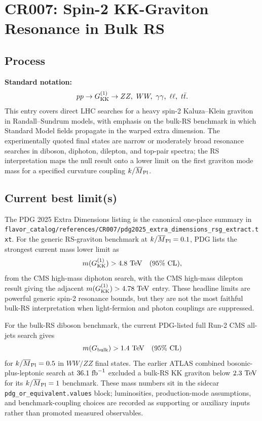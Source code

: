 
\section{CR007: Spin-2 KK-Graviton Resonance in Bulk RS}

\subsection*{Process}
\textbf{Standard notation:}
\[
  pp \to G^{(1)}_{\rm KK} \to ZZ,\ WW,\ \gamma\gamma,\ \ell\ell,\ t\bar t .
\]
This entry covers direct LHC searches for a heavy spin-2 Kaluza--Klein
graviton in Randall--Sundrum models, with emphasis on the bulk-RS benchmark in
which Standard Model fields propagate in the warped extra dimension.  The
experimentally quoted final states are narrow or moderately broad resonance
searches in diboson, diphoton, dilepton, and top-pair spectra; the RS
interpretation maps the null result onto a lower limit on the first graviton
mode mass for a specified curvature coupling \(k/\overline{M}_{\rm Pl}\).

\subsection*{Current best limit(s)}
The PDG 2025 Extra Dimensions listing is the canonical one-place summary in
\texttt{flavor\_catalog/references/CR007/pdg2025\_extra\_dimensions\_rsg\_extract.txt}.
For the generic RS-graviton benchmark at \(k/\overline{M}_{\rm Pl}=0.1\), PDG
lists the strongest current mass lower limit as
\[
  m(G^{(1)}_{\rm KK}) > 4.8~{\rm TeV}\quad(95\%~{\rm CL}),
\]
from the CMS high-mass diphoton search, with the CMS high-mass dilepton result
giving the adjacent \(m(G^{(1)}_{\rm KK})>4.78~{\rm TeV}\) entry.  These
headline limits are powerful generic spin-2 resonance bounds, but they are not
the most faithful bulk-RS interpretation when light-fermion and photon
couplings are suppressed.

For the bulk-RS diboson benchmark, the current PDG-listed full Run-2 CMS
all-jets search gives
\[
  m(G_{\rm bulk}) > 1.4~{\rm TeV}\quad(95\%~{\rm CL})
\]
for \(k/\overline{M}_{\rm Pl}=0.5\) in \(WW/ZZ\) final states.  The earlier
ATLAS combined bosonic-plus-leptonic search at \(36.1~{\rm fb}^{-1}\) excluded
a bulk-RS KK graviton below \(2.3~{\rm TeV}\) for its \(k/\overline{M}_{\rm Pl}=1\)
benchmark.  These mass numbers sit in the sidecar
\texttt{pdg\_or\_equivalent.values} block; luminosities, production-mode
assumptions, and benchmark-coupling choices are recorded as supporting or
auxiliary inputs rather than promoted measured observables.

